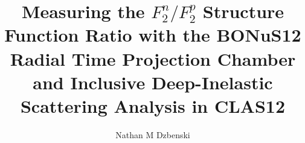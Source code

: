 \title{Measuring the $F_2^n/F_2^p$ Structure Function Ratio with the BONuS12 Radial Time Projection Chamber and Inclusive Deep-Inelastic Scattering Analysis in CLAS12}

\author{Nathan M Dzbenski}




\graphicspath{{figures/}}

